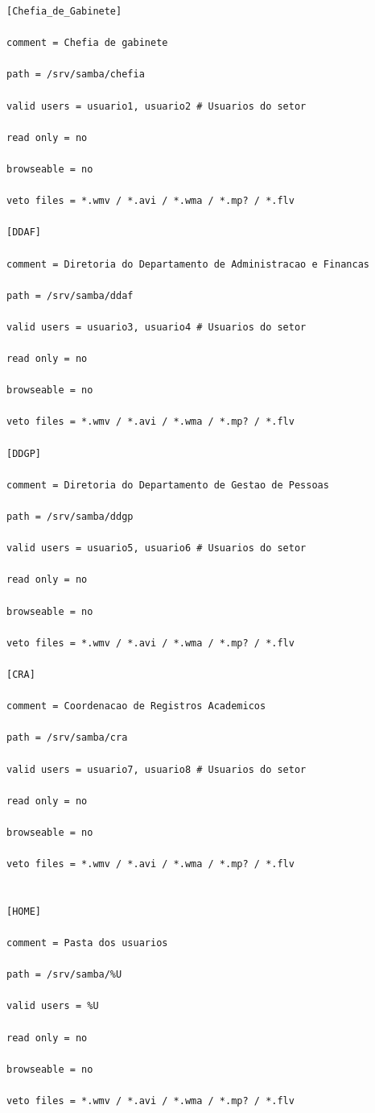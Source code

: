 \begin{lstlisting}[caption=Arquivo /etc/smb.conf com as variáveis aplicadas no estudo de caso.,label={smb_conf_estudo}]
[Chefia_de_Gabinete]

comment = Chefia de gabinete

path = /srv/samba/chefia

valid users = usuario1, usuario2 # Usuarios do setor

read only = no

browseable = no

veto files = *.wmv / *.avi / *.wma / *.mp? / *.flv

[DDAF] 

comment = Diretoria do Departamento de Administracao e Financas

path = /srv/samba/ddaf

valid users = usuario3, usuario4 # Usuarios do setor

read only = no

browseable = no

veto files = *.wmv / *.avi / *.wma / *.mp? / *.flv

[DDGP] 

comment = Diretoria do Departamento de Gestao de Pessoas

path = /srv/samba/ddgp

valid users = usuario5, usuario6 # Usuarios do setor

read only = no

browseable = no

veto files = *.wmv / *.avi / *.wma / *.mp? / *.flv

[CRA] 

comment = Coordenacao de Registros Academicos

path = /srv/samba/cra

valid users = usuario7, usuario8 # Usuarios do setor

read only = no

browseable = no

veto files = *.wmv / *.avi / *.wma / *.mp? / *.flv


[HOME] 

comment = Pasta dos usuarios

path = /srv/samba/%U

valid users = %U

read only = no

browseable = no

veto files = *.wmv / *.avi / *.wma / *.mp? / *.flv
\end{lstlisting}

